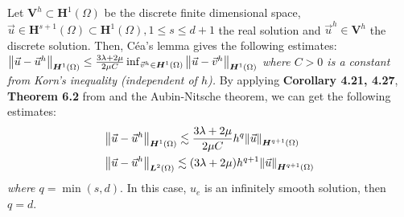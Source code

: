 \documentclass[a4paper,12pt,twoside]{report}
\begin{document}
Let $\boldsymbol V^h \subset \boldsymbol H^1(\Omega)$ be the discrete finite dimensional space, $\vec u \in \boldsymbol H^{s+1}(\Omega) \subset \boldsymbol H^1(\Omega), 1 \leq s \leq d+1$ the real solution and $\vec u^h \in \boldsymbol V^h$ the discrete solution.
Then, Céa's lemma gives the following estimates: 
$\norm{\vec u - \vec u^h}_{\boldsymbol H^1(\Omega)} \leq \frac{3\lambda + 2\mu}{2\mu C} \inf_{\vec v^h \in \boldsymbol H^1(\Omega)} \norm{\vec u - \vec v^h}_{\boldsymbol H^1(\Omega)}$
\textit{where $C > 0$ is a constant from Korn's inequality (independent of $h$).}
By applying \textbf{Corollary 4.21, 4.27}, \textbf{Theorem 6.2} from \cite{da_veiga_mathematical_2014} and the Aubin-Nitsche theorem, we can get the following estimates: 
\begin{equation}
\begin{aligned}
& \norm{\vec u - \vec u^h}_{\boldsymbol H^1(\Omega)} \lesssim \frac{3\lambda + 2\mu}{2\mu C} h^q \norm{\vec u}_{\boldsymbol H^{q+1}(\Omega)} \\
& \norm{\vec u - \vec u^h}_{\boldsymbol L^2(\Omega)} \lesssim (3\lambda + 2\mu) h^{q+1}\norm{\vec u}_{\boldsymbol H^{q+1}(\Omega)}
\end{aligned}
\label{eq:convergence_estimates}
\end{equation}
\textit{where $q = \min{(s,d)}$}. In this case, $u_e$ is an infinitely smooth solution, then $q = d$. 
\end{document}
